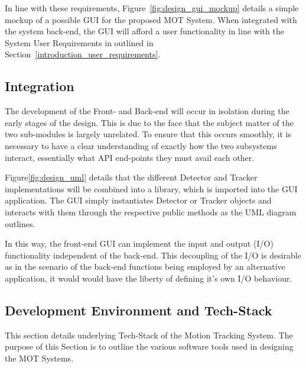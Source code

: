 In line with these requirements, Figure~\ref{fig:design_gui_mockup} details a
simple mockup of a possible GUI for the proposed MOT System. When integrated
with the system back-end, the GUI will afford a user functionality in
line with the System User Requirements in outlined in
Section~\ref{introduction_user_requirements}.


\subsection{Integration}
The development of the Front- and Back-end will occur in isolation during the
early stages of the design. This is due to the face that the subject matter of
the two sub-modules is largely unrelated. To ensure that this occurs smoothly,
it is necessary to have a clear understanding of exactly how the two subsystems
interact, essentially what API end-points they must avail each other.

Figure\ref{fig:design_uml} details that the different Detector and Tracker
implementations will be combined into a library, which is imported into the GUI
application.
The GUI simply instantiates Detector or Tracker objects and interacts with them
through the respective public methods as the UML diagram outlines.

In this way, the front-end GUI can implement the input and output (I/O) functionality
independent of the back-end. This decoupling of the I/O is desirable as in the
scenario of the back-end functions being employed by an alternative application,
it would would have the liberty of defining it's own I/O behaviour. 


\subsection{Development Environment and Tech-Stack}
This section details underlying Tech-Stack of the Motion Tracking System. The
purpose of this Section is to outline the various software tools used in
designing the MOT Systems.


